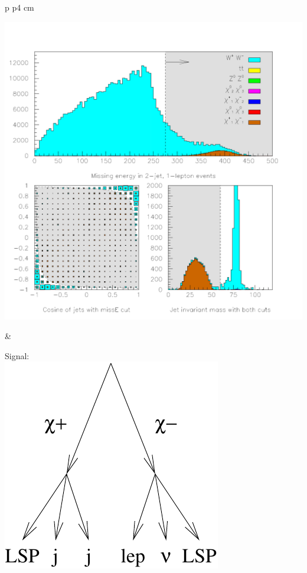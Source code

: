 \documentclass[landscape]{article}
\begin{document}
\LARGE
\renewcommand{\labelitemi}{-}
\setlength{\parindent}{0 cm}

\begin{center} \begin{tabular}{p{\textheight} p{4 cm}}
    \begin{minipage}{\linewidth}
      \includegraphics[width=\linewidth]{charginos_1.pdf}
    \end{minipage} &
    \begin{minipage}{\linewidth}
      Signal: \\
      \includegraphics[width=\linewidth]{charginos_signal.pdf}


\end{minipage}
\end{tabular}
\end{center}
\end{document}
